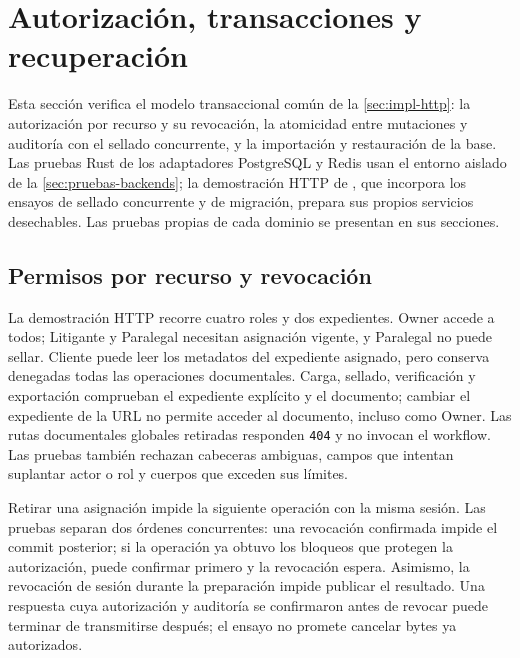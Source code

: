 
\section{Autorización, transacciones y recuperación}\label{sec:pruebas-transacciones}

Esta sección verifica el modelo transaccional común de la \cref{sec:impl-http}: la autorización por recurso y su revocación, la atomicidad entre mutaciones y auditoría con el sellado concurrente, y la importación y restauración de la base. Las pruebas Rust de los adaptadores PostgreSQL y Redis usan el entorno aislado de la \cref{sec:pruebas-backends}; la demostración HTTP de , que incorpora los ensayos de sellado concurrente y de migración, prepara sus propios servicios desechables. Las pruebas propias de cada dominio se presentan en sus secciones.

\subsection{Permisos por recurso y revocación}\label{sec:pruebas-permisos}

La demostración HTTP recorre cuatro roles y dos expedientes. Owner accede a todos; Litigante y Paralegal necesitan asignación vigente, y Paralegal no puede sellar. Cliente puede leer los metadatos del expediente asignado, pero conserva denegadas todas las operaciones documentales. Carga, sellado, verificación y exportación comprueban el expediente explícito y el documento; cambiar el expediente de la URL no permite acceder al documento, incluso como Owner. Las rutas documentales globales retiradas responden \texttt{404} y no invocan el workflow. Las pruebas también rechazan cabeceras ambiguas, campos que intentan suplantar actor o rol y cuerpos que exceden sus límites.

Retirar una asignación impide la siguiente operación con la misma sesión. Las pruebas separan dos órdenes concurrentes: una revocación confirmada impide el commit posterior; si la operación ya obtuvo los bloqueos que protegen la autorización, puede confirmar primero y la revocación espera. Asimismo, la revocación de sesión durante la preparación impide publicar el resultado. Una respuesta cuya autorización y auditoría se confirmaron antes de revocar puede terminar de transmitirse después; el ensayo no promete cancelar bytes ya autorizados.


